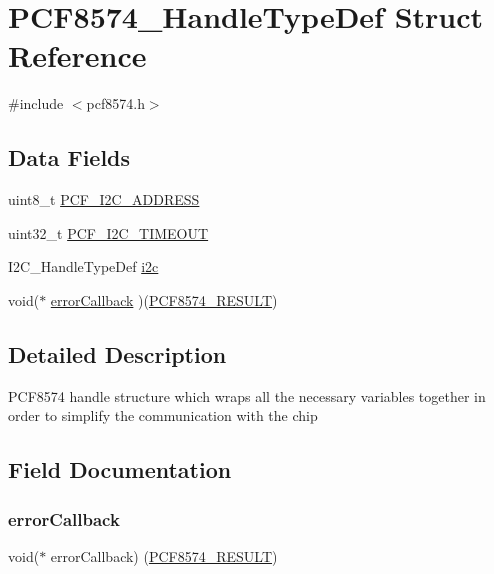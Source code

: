 \hypertarget{struct_p_c_f8574___handle_type_def}{}\section{P\+C\+F8574\+\_\+\+Handle\+Type\+Def Struct Reference}
\label{struct_p_c_f8574___handle_type_def}


{\ttfamily \#include $<$pcf8574.\+h$>$}

\subsection*{Data Fields}
\begin{DoxyCompactItemize}
\item 
uint8\+\_\+t \mbox{\hyperlink{struct_p_c_f8574___handle_type_def_a6dffbcc6620a5fc10e355941f764b5e0}{P\+C\+F\+\_\+\+I2\+C\+\_\+\+A\+D\+D\+R\+E\+SS}}
\item 
uint32\+\_\+t \mbox{\hyperlink{struct_p_c_f8574___handle_type_def_aab54a3fd634f0730d4181d8a079a6755}{P\+C\+F\+\_\+\+I2\+C\+\_\+\+T\+I\+M\+E\+O\+UT}}
\item 
I2\+C\+\_\+\+Handle\+Type\+Def \mbox{\hyperlink{struct_p_c_f8574___handle_type_def_adec15f46e6982891d5eddced4ef1f66b}{i2c}}
\item 
void($\ast$ \mbox{\hyperlink{struct_p_c_f8574___handle_type_def_a18b8cfd74756b1fc814b76bd113e55e8}{error\+Callback}} )(\mbox{\hyperlink{pcf8574_8h_acb986b4815c5ba43b8c1800053f3ed25}{P\+C\+F8574\+\_\+\+R\+E\+S\+U\+LT}})
\end{DoxyCompactItemize}


\subsection{Detailed Description}
P\+C\+F8574 handle structure which wraps all the necessary variables together in order to simplify the communication with the chip 

\subsection{Field Documentation}
\mbox{\label{struct_p_c_f8574___handle_type_def_a18b8cfd74756b1fc814b76bd113e55e8}} 
\subsubsection{\texorpdfstring{errorCallback}{errorCallback}}
{\footnotesize\ttfamily void($\ast$ error\+Callback) (\mbox{\hyperlink{pcf8574_8h_acb986b4815c5ba43b8c1800053f3ed25}{P\+C\+F8574\+\_\+\+R\+E\+S\+U\+LT}})}

